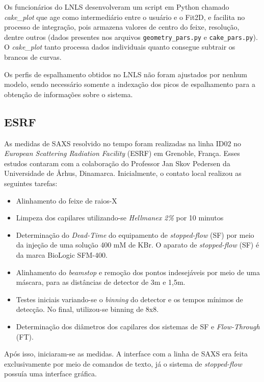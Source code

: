 			Os funcionários do LNLS desenvolveram um script em Python chamado \emph{cake\_plot} que age como intermediário entre o usuário e o Fit2D, e facilita no processo de integração, pois armazena valores de centro do feixe, resolução, dentre outros (dados presentes nos arquivos \texttt{geometry\_pars.py} e \texttt{cake\_pars.py}). O \emph{cake\_plot} tanto processa dados individuais quanto consegue subtrair os brancos de curvas.
			
			Os perfis de espalhamento obtidos no LNLS não foram ajustados por nenhum modelo, sendo necessário somente a indexação dos picos de espalhamento para a obtenção de informações sobre o sistema.		
			
			\subsection{ESRF}  
			As medidas de SAXS resolvido no tempo foram realizadas na linha ID02 no \emph{European Scattering Radiation Facility} (ESRF) em Grenoble, França. Esses estudos contaram com a colaboração do Professor Jan Skov Pedersen da Universidade de \AA rhus, Dinamarca. Inicialmente, o contato local realizou as seguintes tarefas:
			
			\begin{itemize}[noitemsep]
				\item Alinhamento do feixe de raios-X
				\item Limpeza dos capilares utilizando-se \emph{Hellmanex 2\%} por 10 minutos
				\item Determinação do \emph{Dead-Time} do equipamento de \emph{stopped-flow} (SF) por meio da injeção de uma solução 400 mM de KBr. O aparato de \emph{stopped-flow} (SF) é da marca BioLogic SFM-400.
				\item Alinhamento do \emph{beamstop} e remoção dos pontos indesejáveis por meio de uma máscara, para as distâncias de detector de 3m e 1,5m.
				\item Testes iniciais variando-se o \emph{binning} do detector e os tempos mínimos de detecção. No final, utilizou-se binning de 8x8.
				\item Determinação dos diâmetros dos capilares dos sistemas de SF e \emph{Flow-Through} (FT).
			\end{itemize}
			
			Após isso, iniciaram-se as medidas. A interface com a linha de SAXS era feita exclusivamente por meio de comandos de texto, já o sistema de \emph{stopped-flow} possuía uma interface gráfica.
			
